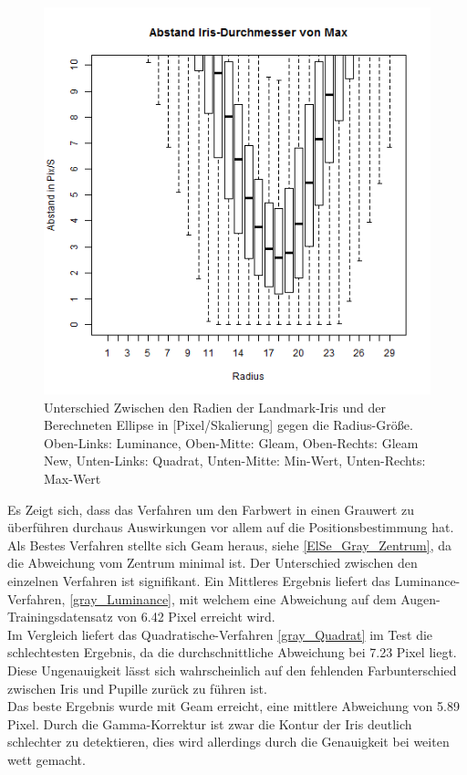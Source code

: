\begin{figure}
	\includegraphics[width=0.32\linewidth]{Eye_Img_Box/Max_Radius_I}
	\caption{Unterschied Zwischen den Radien der Landmark-Iris und der Berechneten Ellipse in [Pixel/Skalierung] gegen die Radius-Größe.\\ Oben-Links: Luminance, Oben-Mitte: Gleam, Oben-Rechts: Gleam New, Unten-Links: Quadrat, Unten-Mitte: Min-Wert, Unten-Rechts: Max-Wert}
	\label{ElSe_Gray_Iris}
\end{figure}
Es Zeigt sich, dass das Verfahren um den Farbwert in einen Grauwert zu überführen durchaus Auswirkungen vor allem auf die Positionsbestimmung hat.\\
Als Bestes Verfahren stellte sich Geam heraus, siehe \autoref{ElSe_Gray_Zentrum}, da die Abweichung vom Zentrum minimal ist. Der Unterschied zwischen den einzelnen Verfahren ist signifikant. Ein Mittleres Ergebnis liefert das Luminance-Verfahren, \autoref{gray_Luminance}, mit welchem eine Abweichung auf dem Augen-Trainingsdatensatz \cite{database_Eye} von 6.42 Pixel erreicht wird.\\
Im Vergleich liefert das Quadratische-Verfahren \autoref{gray_Quadrat} im Test die schlechtesten Ergebnis, da die durchschnittliche Abweichung bei 7.23 Pixel liegt. Diese Ungenauigkeit lässt sich wahrscheinlich auf den fehlenden Farbunterschied zwischen Iris und Pupille  zurück zu führen ist.\\
Das beste Ergebnis wurde mit Geam erreicht, eine mittlere Abweichung von 5.89 Pixel. Durch die Gamma-Korrektur ist zwar die Kontur der Iris deutlich schlechter zu detektieren, dies wird allerdings durch die Genauigkeit bei weiten wett gemacht.\\
